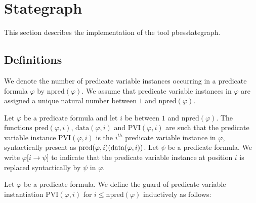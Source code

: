                       

\section{Stategraph}

This section describes the implementation of the tool pbesstategraph.

\subsection{Definitions}

We denote the number of predicate variable instances occurring in a
predicate formula $\varphi $ by $\mathrm{npred}(\varphi )$. We assume that
predicate variable instances in $\varphi $ are assigned a unique natural
number between $1$ and $\mathrm{npred}(\varphi )$.

\begin{definition}
Let $\varphi $ be a predicate formula and let $i$ be between $1$ and $%
\mathrm{npred}(\varphi )$. The functions $\mathrm{pred}(\varphi ,i)$, $%
\mathrm{data}(\varphi ,i)$ and $\mathrm{PVI}(\varphi ,i)$ are such that the
predicate variable instance $\mathrm{PVI}(\varphi ,i)$ is the $i^{th}$
predicate variable instance in $\varphi $, syntactically present as $\mathrm{%
pred}(\varphi ,i)(\mathrm{data}(\varphi ,i))$. Let $\psi $ be a predicate
formula. We write $\varphi \lbrack i\rightarrow \psi ]$ to indicate that the
predicate variable instance at position $i$ is replaced syntactically by $%
\psi $ in $\varphi $.
\end{definition}

\begin{definition}
Let $\varphi $ be a predicate formula. We define the guard of predicate
variable instantiation $\mathrm{PVI}(\varphi ,i)$ for $i\leq \mathrm{npred}%
(\varphi )$ inductively as follows:
\end{definition}

